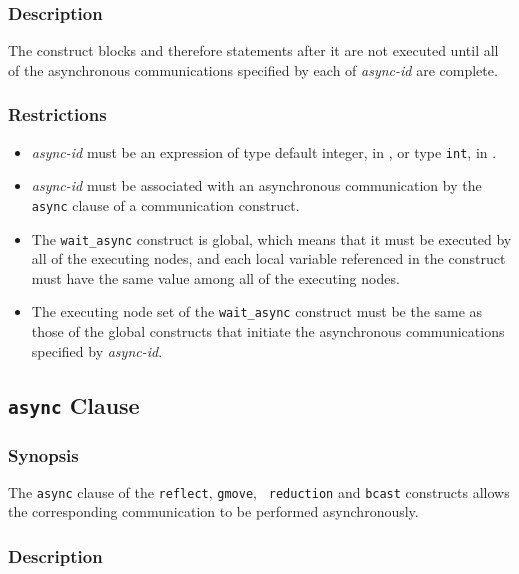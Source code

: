 \subsubsection*{Description}

The {\tt {}} construct blocks and therefore
statements after it are not executed until all of the asynchronous
communications specified by each of {\it async-id} are complete. 

\subsubsection*{Restrictions}

\begin{itemize}
 \item {\it async-id} must be an expression of type default integer, in
       {\XMPF}, or type {\tt int}, in {\XMPC}.
\item {\it async-id} must be associated with an asynchronous
      communication by the {\tt async} clause of a communication
      construct.
\item The {\tt wait\_async} construct is global, which means that it must
      be executed by all of the executing nodes, and each local variable
      referenced in the construct must have the same value among all of
      the executing nodes.
\item The executing node set of the {\tt wait\_async} construct must be
      the same as those of the global constructs that initiate the
      asynchronous communications specified by {\it async-id}.
\end{itemize}


\subsection{{\tt async} Clause}

\subsubsection*{Synopsis}

The {\tt async} clause of the {\tt reflect}, {\tt gmove}, {\tt
reduction} and {\tt bcast} constructs allows the corresponding
communication to be performed asynchronously.

\subsubsection*{Description}

